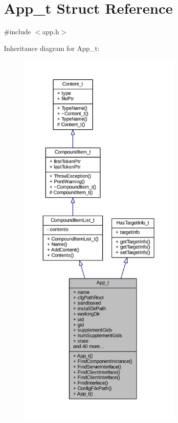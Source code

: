 \hypertarget{struct_app__t}{}\section{App\+\_\+t Struct Reference}
\label{struct_app__t}


{\ttfamily \#include $<$app.\+h$>$}



Inheritance diagram for App\+\_\+t\+:
\nopagebreak
\begin{figure}[H]
\begin{center}
\leavevmode
\includegraphics[height=550pt]{struct_app__t__inherit__graph}
\end{center}
\end{figure}


